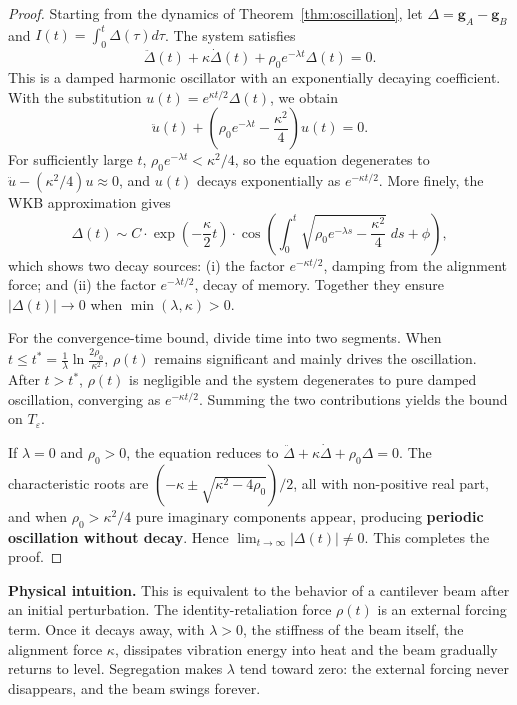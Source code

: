 \documentclass[12pt,a4paper]{article}
\theoremstyle{remark}
\begin{document}
\begin{proof}
Starting from the dynamics of Theorem~\ref{thm:oscillation}, let $\Delta = \mathbf{g}_A - \mathbf{g}_B$ and $I(t) = \int_0^t \Delta(\tau) d\tau$. The system satisfies
\begin{equation}
    \ddot{\Delta}(t) + \kappa \dot{\Delta}(t) + \rho_0 e^{-\lambda t} \Delta(t) = 0.
\end{equation}
This is a damped harmonic oscillator with an exponentially decaying coefficient. With the substitution $u(t) = e^{\kappa t/2} \Delta(t)$, we obtain
\begin{equation}
    \ddot{u}(t) + \left(\rho_0 e^{-\lambda t} - \frac{\kappa^2}{4}\right) u(t) = 0.
\end{equation}
For sufficiently large $t$, $\rho_0 e^{-\lambda t} < \kappa^2/4$, so the equation degenerates to $\ddot{u} - (\kappa^2/4)u \approx 0$, and $u(t)$ decays exponentially as $e^{-\kappa t/2}$. More finely, the WKB approximation gives
\begin{equation}
    \Delta(t) \sim C \cdot \exp\left(-\frac{\kappa}{2}t\right) \cdot \cos\left(\int_0^t \sqrt{\rho_0 e^{-\lambda s} - \frac{\kappa^2}{4}}\; ds + \phi\right),
\end{equation}
which shows two decay sources: (i) the factor $e^{-\kappa t/2}$, damping from the alignment force; and (ii) the factor $e^{-\lambda t/2}$, decay of memory. Together they ensure $|\Delta(t)| \to 0$ when $\min(\lambda, \kappa) > 0$.

For the convergence-time bound, divide time into two segments. When $t \leq t^* = \frac{1}{\lambda}\ln\frac{2\rho_0}{\kappa^2}$, $\rho(t)$ remains significant and mainly drives the oscillation. After $t > t^*$, $\rho(t)$ is negligible and the system degenerates to pure damped oscillation, converging as $e^{-\kappa t/2}$. Summing the two contributions yields the bound on $T_\varepsilon$.

If $\lambda = 0$ and $\rho_0 > 0$, the equation reduces to $\ddot{\Delta} + \kappa\dot{\Delta} + \rho_0\Delta = 0$. The characteristic roots are $(-\kappa \pm \sqrt{\kappa^2 - 4\rho_0})/2$, all with non-positive real part, and when $\rho_0 > \kappa^2/4$ pure imaginary components appear, producing \textbf{periodic oscillation without decay}. Hence $\lim_{t\to\infty} |\Delta(t)| \neq 0$. This completes the proof.
\end{proof}

\textbf{Physical intuition.} This is equivalent to the behavior of a cantilever beam after an initial perturbation. The identity-retaliation force $\rho(t)$ is an external forcing term. Once it decays away, with $\lambda > 0$, the stiffness of the beam itself, the alignment force $\kappa$, dissipates vibration energy into heat and the beam gradually returns to level. Segregation makes $\lambda$ tend toward zero: the external forcing never disappears, and the beam swings forever.
\end{document}
